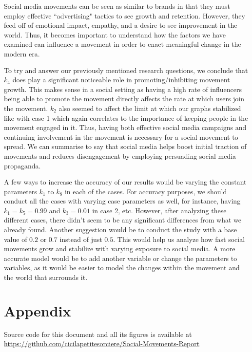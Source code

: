 \documentclass{article}
\begin{document}
    Social media movements can be seen as similar to brands in that they must employ effective ``advertising" tactics to see growth and retention. However, they feed off of emotional impact, empathy, and a desire to see improvement in the world. Thus, it becomes important to understand how the factors we have examined can influence a movement in order to enact meaningful change in the modern era. 

    To try and answer our previously mentioned research questions, we conclude that $k_4$ does play a significant noticeable role in promoting/inhibiting movement growth. This makes sense in a social setting as having a high rate of influencers being able to promote the movement directly affects the rate at which users join the movement. $k_2$ also seemed to affect the limit at which our graphs stabilized like with case 1 which again correlates to the importance of keeping people in the movement engaged in it. Thus, having both effective social media campaigns and continuing involvement in the movement is necessary for a social movement to spread. We can summarise to say that social media helps boost initial traction of movements and reduces disengagement by employing persuading social media propaganda. 

    A few ways to increase the accuracy of our results would be varying the constant parameters $k_1$ to $k_8$ in each of the cases. For accuracy purposes, we should conduct all the cases with varying case parameters as well, for instance, having $k_1=k_5 = 0.99$ and $k_3 = 0.01$ in case 2, etc. However, after analyzing these different cases, there didn't seem to be any significant differences from what we already found. Another suggestion would be to conduct the study with a base value of $0.2$ or $0.7$ instead of just $0.5$. This would help us analyze how fast social movements grow and stabilize with varying exposure to social media. A more accurate model would be to add another variable or change the parameters to variables, as it would be easier to model the changes within the movement and the world that surrounds it.
    
    
    \section{Appendix}
    Source code for this document and all its figures is available at \url{https://github.com/cicilapetitesorciere/Social-Movements-Report}
\end{document}
